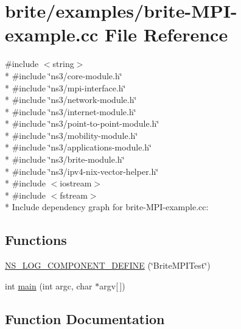 \hypertarget{brite-MPI-example_8cc}{}\section{brite/examples/brite-\/\+M\+P\+I-\/example.cc File Reference}
\label{brite-MPI-example_8cc}
{\ttfamily \#include $<$string$>$}\\*
{\ttfamily \#include \char`\"{}ns3/core-\/module.\+h\char`\"{}}\\*
{\ttfamily \#include \char`\"{}ns3/mpi-\/interface.\+h\char`\"{}}\\*
{\ttfamily \#include \char`\"{}ns3/network-\/module.\+h\char`\"{}}\\*
{\ttfamily \#include \char`\"{}ns3/internet-\/module.\+h\char`\"{}}\\*
{\ttfamily \#include \char`\"{}ns3/point-\/to-\/point-\/module.\+h\char`\"{}}\\*
{\ttfamily \#include \char`\"{}ns3/mobility-\/module.\+h\char`\"{}}\\*
{\ttfamily \#include \char`\"{}ns3/applications-\/module.\+h\char`\"{}}\\*
{\ttfamily \#include \char`\"{}ns3/brite-\/module.\+h\char`\"{}}\\*
{\ttfamily \#include \char`\"{}ns3/ipv4-\/nix-\/vector-\/helper.\+h\char`\"{}}\\*
{\ttfamily \#include $<$iostream$>$}\\*
{\ttfamily \#include $<$fstream$>$}\\*
Include dependency graph for brite-\/\+M\+P\+I-\/example.cc\+:
\subsection*{Functions}
\begin{DoxyCompactItemize}
\item 
\hyperlink{brite-MPI-example_8cc_a79dce00b6f357d283b3a796267018fb2}{N\+S\+\_\+\+L\+O\+G\+\_\+\+C\+O\+M\+P\+O\+N\+E\+N\+T\+\_\+\+D\+E\+F\+I\+NE} (\char`\"{}Brite\+M\+P\+I\+Test\char`\"{})
\item 
int \hyperlink{brite-MPI-example_8cc_a0ddf1224851353fc92bfbff6f499fa97}{main} (int argc, char $\ast$argv\mbox{[}$\,$\mbox{]})
\end{DoxyCompactItemize}


\subsection{Function Documentation}
